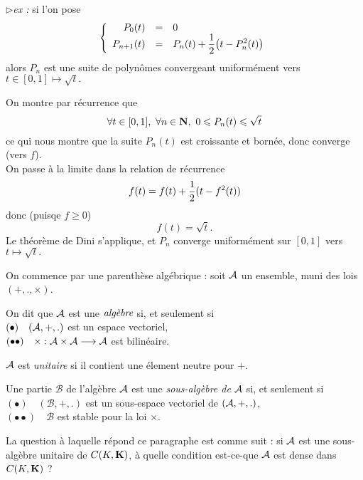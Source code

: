 \documentclass[a4paper,11pt, twoside]{article}
\begin{document}
$\triangleright$\emph{ex :} si l'on pose 
$$\left\{\begin{array}{rcl}
P_0(t)&=&0\\
P_{n+1}(t)&=&P_n(t)+\displaystyle\frac12\big(t-P^2_n(t)\big)
\end{array}\right.$$
alors $P_n$ est une suite de polynômes convergeant uniformément vers $t\in[0,1]\longmapsto \sqrt t.$


\begin{Proof}
  On montre par récurrence que 
  $$\forall t\in[0,1],\ \forall n\in\mathbf N,\ 0\leqslant P_n(t)\leqslant \sqrt t$$
  ce qui nous montre que la suite $P_n(t)$ est croissante et bornée, donc converge (vers $f$).\\
  On passe à la limite dans la relation de récurrence 
  $$f(t)=f(t)+\displaystyle\frac12(t-f^2(t))$$
  donc (puisqe $f\geqslant0$)
  $$f(t)=\sqrt t.$$
  Le théorème de Dini s'applique, et $P_n$ converge uniformément sur $[0,1]$ vers $t\mapsto\sqrt t.$
\end{Proof}






On commence par une parenthèse algébrique : soit $\mathcal A$ un ensemble, muni des lois $(+,.,\times)$.


\begin{Def}
  On dit que $\mathcal A$ est une $\emph{algèbre}$ si, et seulement si\\
  $(\bullet)\quad (\mathcal A,+,.)$ est un espace vectoriel,\\
  $(\bullet\bullet)\quad \times : \mathcal A\times\mathcal A\longrightarrow\mathcal A$ est bilinéaire.
\end{Def}


$\mathcal A$ est \emph{unitaire} si il contient une élement neutre pour $+$.


\begin{Def}
  Une partie $\mathcal B$ de l'algèbre $\mathcal A$ est une \emph{sous-algèbre de} $\mathcal A$ si, et seulement si\\
  $(\bullet)\quad (\mathcal B,+,.)$ est un sous-espace vectoriel de $(\mathcal A,+,.)$,\\
  $(\bullet\bullet)\quad \mathcal B$ est stable pour la loi $\times$.\\
\end{Def}

La question à laquelle répond ce paragraphe est comme suit : si $\mathcal A$ est une sous-algèbre unitaire de $C(K,\mathbf K)$, à quelle condition est-ce-que $\mathcal A$ est dense dans $C(K,\mathbf K)$ ?\\[1em]
\end{document}
